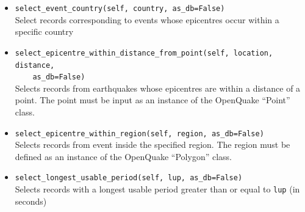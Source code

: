 \begin{itemize}
\item \verb;select_event_country(self, country, as_db=False);\\

Select records corresponding to events whose epicentres occur within a specific country

\item \verb;select_epicentre_within_distance_from_point(self, location, distance,;\\
\verb;    as_db=False);\\

Selects records from earthquakes whose epicentres are within a distance of a point. The point must be input as an instance of the OpenQuake ``Point'' class.

\item \verb;select_epicentre_within_region(self, region, as_db=False);\\

Selects records from event inside the specified region. The region must be defined as an instance of the OpenQuake ``Polygon'' class.

\item \verb;select_longest_usable_period(self, lup, as_db=False);\\

Selects records with a longest usable period greater than or equal to \verb=lup= (in seconds)

\end{itemize}

  




